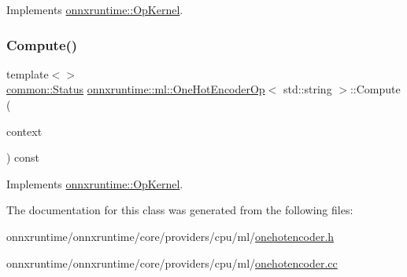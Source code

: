 Implements \mbox{\hyperlink{classonnxruntime_1_1OpKernel_a9eca8656a78b1b3ab9d3351a12798650}{onnxruntime\+::\+Op\+Kernel}}.

\mbox{\label{classonnxruntime_1_1ml_1_1OneHotEncoderOp_afd312f77e1b049184f7e2c3dea4ff41d}} 
\subsubsection{\texorpdfstring{Compute()}{Compute()}\hspace{0.1cm}{\footnotesize\ttfamily [2/2]}}
{\footnotesize\ttfamily template$<$$>$ \\
\mbox{\hyperlink{classonnxruntime_1_1common_1_1Status}{common\+::\+Status}} \mbox{\hyperlink{classonnxruntime_1_1ml_1_1OneHotEncoderOp}{onnxruntime\+::ml\+::\+One\+Hot\+Encoder\+Op}}$<$ std\+::string $>$\+::Compute (\begin{DoxyParamCaption}\item[{\mbox{\hyperlink{classonnxruntime_1_1OpKernelContext}{Op\+Kernel\+Context}} $\ast$}]{context }\end{DoxyParamCaption}) const\hspace{0.3cm}{\ttfamily [virtual]}}



Implements \mbox{\hyperlink{classonnxruntime_1_1OpKernel_a9eca8656a78b1b3ab9d3351a12798650}{onnxruntime\+::\+Op\+Kernel}}.



The documentation for this class was generated from the following files\+:\begin{DoxyCompactItemize}
\item 
onnxruntime/onnxruntime/core/providers/cpu/ml/\mbox{\hyperlink{onehotencoder_8h}{onehotencoder.\+h}}\item 
onnxruntime/onnxruntime/core/providers/cpu/ml/\mbox{\hyperlink{onehotencoder_8cc}{onehotencoder.\+cc}}\end{DoxyCompactItemize}
